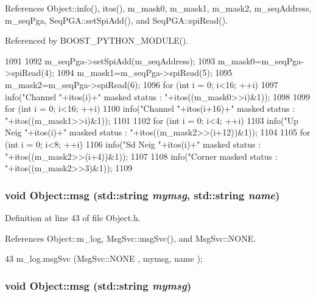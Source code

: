 References Object::info(), itos(), m\_\-mask0, m\_\-mask1, m\_\-mask2, m\_\-seqAddress, m\_\-seqPga, SeqPGA::setSpiAdd(), and SeqPGA::spiRead().

Referenced by BOOST\_\-PYTHON\_\-MODULE().


\begin{DoxyCode}
1091                     {
1092   m_seqPga->setSpiAdd(m_seqAddress);
1093   m_mask0=m_seqPga->spiRead(4);
1094   m_mask1=m_seqPga->spiRead(5);
1095   m_mask2=m_seqPga->spiRead(6);
1096   for (int i = 0; i<16; ++i){
1097     info("Channel "+itos(i)+" masked status : "+itos((m_mask0>>i)&1));
1098   }
1099   for (int i = 0; i<16; ++i){
1100     info("Channel "+itos(i+16)+" masked status : "+itos((m_mask1>>i)&1));
1101   }  
1102   for (int i = 0; i<4; ++i){
1103     info("Up Neig "+itos(i)+" masked status : "+itos((m_mask2>>(i+12))&1));
1104   }
1105   for (int i = 0; i<8; ++i){
1106     info("Sd Neig "+itos(i)+" masked status : "+itos((m_mask2>>(i+4))&1));
1107   }
1108   info("Corner masked status : "+itos((m_mask2>>3)&1));
1109 }
\end{DoxyCode}
\hypertarget{classObject_ac5d59299273cee27aacf7de00d2e7034}{
\subsubsection[{msg}]{\setlength{\rightskip}{0pt plus 5cm}void Object::msg (std::string {\em mymsg}, \/  std::string {\em name})}}
\label{classObject_ac5d59299273cee27aacf7de00d2e7034}


Definition at line 43 of file Object.h.

References Object::m\_\-log, MsgSvc::msgSvc(), and MsgSvc::NONE.


\begin{DoxyCode}
43 { m_log.msgSvc (MsgSvc::NONE    , mymsg, name ); }
\end{DoxyCode}
\hypertarget{classObject_a58b2d0618c2d08cf2383012611528d97}{
\subsubsection[{msg}]{\setlength{\rightskip}{0pt plus 5cm}void Object::msg (std::string {\em mymsg})}}
\label{classObject_a58b2d0618c2d08cf2383012611528d97}


